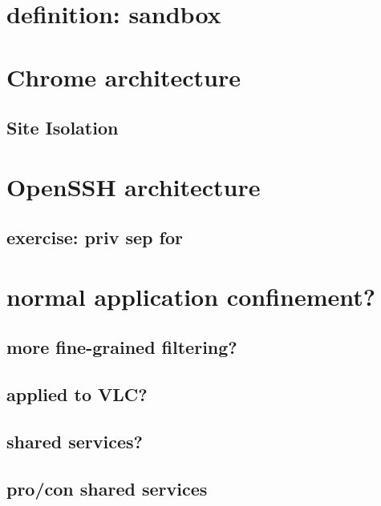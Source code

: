 \section{definition: sandbox}


\section{Chrome architecture}


\subsection{Site Isolation}


\section{OpenSSH architecture}


\subsection{exercise: priv sep for}


\section{normal application confinement?}


\subsection{more fine-grained filtering?}


\subsection{applied to VLC?}


\subsection{shared services?}


\subsection{pro/con shared services}


